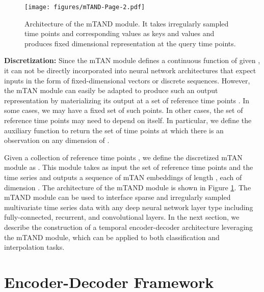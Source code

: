 \documentclass{article} \usepackage{iclr2021_conference,times}
\begin{document}
\begin{figure}[t]
\centering
\texttt{[image: figures/mTAND-Page-2.pdf]}
\caption{Architecture of the mTAND module. It takes irregularly sampled time points and corresponding values as keys and values and produces fixed dimensional representation at the query time points.}
\label{fig:mTAND}
\end{figure}

\textbf{Discretization:} Since the mTAN module defines a continuous function of  given , it can not be directly incorporated into neural network architectures that expect inputs in the form of fixed-dimensional vectors or discrete sequences. However, the mTAN module can easily be adapted to produce such an output representation by materializing its output at a set of reference time points . In some cases, we may have a fixed set of such points. In other cases, the set of reference time points may need to depend on  itself. In particular, we define the auxiliary function  to return the set of time points at which there is an observation on any dimension of .  

Given a collection of reference time points , we define the discretized mTAN module  as . This module takes as input the set of reference time points  and the time series  and outputs a sequence of mTAN embeddings of length , each of dimension . The architecture of the mTAND module is shown in Figure \ref{fig:mTAND}. The mTAND module can be used to interface sparse and irregularly sampled multivariate time series data with any deep neural network layer type including fully-connected, recurrent, and convolutional layers. In the next section, we describe the construction of a temporal encoder-decoder architecture leveraging the mTAND module, which can be applied to both classification and interpolation tasks. 






















 
\section{Encoder-Decoder Framework}
\end{document}
